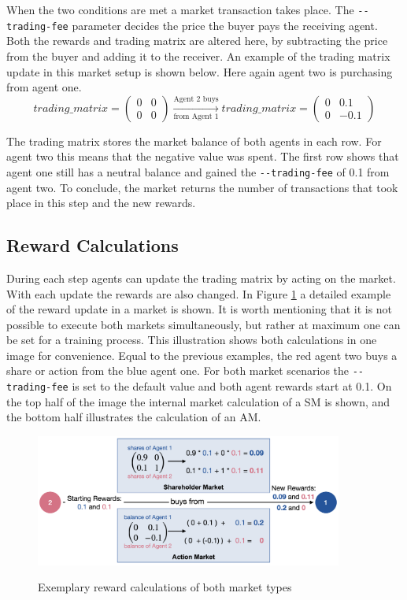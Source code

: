 When the two conditions are met a market transaction takes place. The \verb|--trading-fee| parameter decides the price the buyer pays the receiving agent. Both the rewards and trading matrix are altered here, by subtracting the price from the buyer and adding it to the receiver. An example of the trading matrix update in this market setup is shown below. Here again agent two is purchasing from agent one.
\begin{equation*}
trading\_matrix = 
\begin{pmatrix}
0 & 0 \\
0 & 0
\end{pmatrix} \xrightarrow[\text{from Agent 1}]{\text{Agent 2 buys}} 
trading\_matrix = 
\begin{pmatrix}
0 & 0.1 \\
0 & -0.1
\end{pmatrix} 
\end{equation*}

The trading matrix stores the market balance of both agents in each row. For agent two this means that the negative value was spent. The first row shows that agent one still has a neutral balance and gained the \verb|--trading-fee| of 0.1 from agent two. To conclude, the market returns the number of transactions that took place in this step and the new rewards.

\subsection{Reward Calculations}\label{market_reward_calc}
During each step agents can update the trading matrix by acting on the market. With each update the rewards are also changed. In Figure \ref{fig:market_rewards} a detailed example of the reward update in a market is shown. It is worth mentioning that it is not possible to execute both markets simultaneously, but rather at maximum one can be set for a training process. This illustration shows both calculations in one image for convenience. Equal to the previous examples, the red agent two buys a share or action from the blue agent one. For both market scenarios the \verb|--trading-fee| is set to the default value and both agent rewards start at 0.1. On the top half of the image the internal market calculation of a SM is shown, and the bottom half illustrates the calculation of an AM.
\begin{figure}[hpbt]
    \centering
    \includegraphics[width=0.9\textwidth]{pictures/new_market_rewards}\\
    \caption[Exemplary Reward Calculation Of Markets]{Exemplary reward calculations of both market types}\label{fig:market_rewards}
\end{figure}

